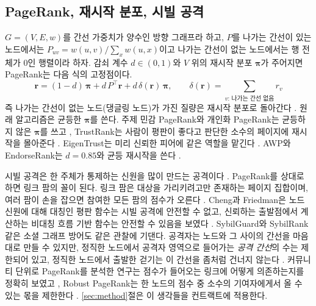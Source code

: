 \subsection{PageRank, 재시작 분포, 시빌 공격}
\label{sec:bg-pagerank}

$G=(V,E,w)$를 간선 가중치가 양수인 방향 그래프라 하고, $P$를 나가는 간선이 있는 노드에서는 $P_{uv}=w(u,v)/\sum_x w(u,x)$이고 나가는 간선이 없는 노드에서는 행 전체가 0인 행렬이라 하자. 감쇠 계수 $d\in(0,1)$와 $V$ 위의 재시작 분포 $\boldsymbol{\pi}$가 주어지면 PageRank는 다음 식의 고정점이다.
\begin{equation}
\label{eq:pagerank}
\mathbf{r} = (1-d)\,\boldsymbol{\pi} + d\,P^{\top}\mathbf{r} + d\,\delta(\mathbf{r})\,\boldsymbol{\pi},
\qquad
\delta(\mathbf{r}) = \sum_{v:\,\text{나가는 간선 없음}} r_v
\end{equation}
즉 나가는 간선이 없는 노드(댕글링 노드)가 가진 질량은 재시작 분포로 돌아간다 \cite{page1998pagerank,langville2006google}. 원래 알고리즘은 균등한 $\boldsymbol{\pi}$를 쓴다. 주제 민감 PageRank와 개인화 PageRank는 균등하지 않은 $\boldsymbol{\pi}$를 쓰고 \cite{haveliwala2003topic,jeh2003scaling}, TrustRank는 사람이 평판이 좋다고 판단한 소수의 페이지에 재시작을 몰아준다 \cite{gyongyi2004trustrank}. EigenTrust는 미리 신뢰한 피어에 같은 역할을 맡긴다 \cite{kamvar2003eigentrust}. AWP와 EndorseRank는 $d=0.85$와 균등 재시작을 쓴다 \cite{do2023awp,kwon2026endorserank}.

시빌 공격은 한 주체가 통제하는 신원을 많이 만드는 공격이다 \cite{douceur2002sybil}. PageRank를 상대로 하면 링크 팜의 꼴이 된다. 링크 팜은 대상을 가리키려고만 존재하는 페이지 집합이며, 여러 팜이 손을 잡으면 참여한 모든 팜의 점수가 오른다 \cite{gyongyi2005alliances}. Cheng과 Friedman은 노드 신원에 대해 대칭인 평판 함수는 시빌 공격에 안전할 수 없고, 신뢰하는 출발점에서 계산하는 비대칭 흐름 기반 함수는 안전할 수 있음을 보였다 \cite{cheng2005sybilproof}. SybilGuard와 SybilRank 같은 소셜 그래프 방어도 같은 관찰에 기댄다. 공격자는 노드와 그 사이의 간선을 마음대로 만들 수 있지만, 정직한 노드에서 공격자 영역으로 들어가는 \emph{공격 간선}의 수는 제한되어 있고, 정직한 노드에서 출발한 걷기는 이 간선을 좀처럼 건너지 않는다 \cite{yu2006sybilguard,cao2012sybilrank}. 커뮤니티 단위로 PageRank를 분석한 연구는 점수가 들어오는 링크에 어떻게 의존하는지를 정확히 보였고 \cite{bianchini2005inside}, Robust PageRank는 한 노드의 점수 중 소수의 기여자에게서 올 수 있는 몫을 제한한다 \cite{andersen2008robust}. \ref{sec:method}절은 이 생각들을 컨트랙트에 적용한다.

